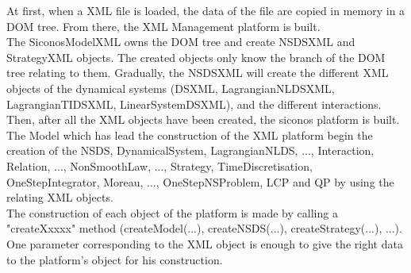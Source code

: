 At first, when a XML file is loaded, the data of the file are copied in memory in a DOM tree. From
there, the XML Management platform is built.\\
The SiconosModelXML owns the DOM tree and create NSDSXML and StrategyXML objects. The created objects
only know the branch of the DOM tree relating to them. Gradually, the NSDSXML will create the
different XML objects of the dynamical systems (DSXML, LagrangianNLDSXML, LagrangianTIDSXML,
LinearSystemDSXML), and the different interactions.\\
Then, after all the XML objects have been created, the \ac{siconos} platform is built.\\
The Model which has lead the construction of the XML platform begin the creation of the NSDS,
DynamicalSystem, LagrangianNLDS, ..., Interaction, Relation, ..., NonSmoothLaw, ..., Strategy,
TimeDiscretisation, OneStepIntegrator, Moreau, ..., OneStepNSProblem, LCP and QP by using the
relating XML objects.\\
The construction of each object of the platform is made by calling a
"createXxxxx" method (createModel(...), createNSDS(...), createStrategy(...), ...). One parameter
corresponding to the XML object is enough to give the right data to the platform's object for his
construction.



